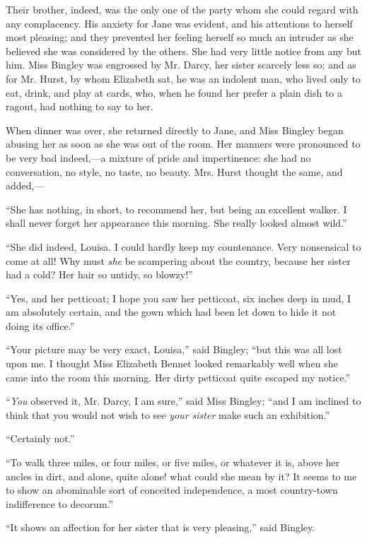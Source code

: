 Their brother, indeed, was the only one of the party whom she could regard with any complacency. His anxiety for Jane was evident, and his attentions to herself most pleasing; and they prevented her feeling herself so much an intruder as she believed she was considered by the others. She had very little notice from any but him. Miss Bingley was engrossed by Mr. Darcy, her sister scarcely less so; and as for Mr. Hurst, by whom Elizabeth sat, he was an indolent man, who lived only to eat, drink, and play at cards, who, when he found her prefer a plain dish to a ragout, had nothing to say to her.

When dinner was over, she returned directly to Jane, and Miss Bingley began abusing her as soon as she was out of the room. Her manners were pronounced to be very bad indeed,---a mixture of pride and impertinence: she had no conversation, no style, no taste, no beauty. Mrs. Hurst thought the same, and added,---

``She has nothing, in short, to recommend her, but being an excellent walker. I shall never forget her appearance this morning. She really looked almost wild.''

``She did indeed, Louisa. I could hardly keep my countenance. Very nonsensical to come at all! Why must \textit{she} be scampering about the country, because her sister had a cold? Her hair so untidy, so blowzy!''

``Yes, and her petticoat; I hope you saw her petticoat, six inches deep in mud, I am absolutely certain, and the gown which had been let down to hide it not doing its office.''

``Your picture may be very exact, Louisa,'' said Bingley; ``but this was all lost upon me. I thought Miss Elizabeth Bennet looked remarkably well when she came into the room this morning. Her dirty petticoat quite escaped my notice.''

``\textit{You} observed it, Mr. Darcy, I am sure,'' said Miss Bingley; ``and I am inclined to think that you would not wish to see \textit{your sister} make such an exhibition.''

``Certainly not.''

``To walk three miles, or four miles, or five miles, or whatever it is, above her ancles in dirt, and alone, quite alone! what could she mean by it? It seems to me to show an abominable sort of conceited independence, a most country-town indifference to decorum.''

``It shows an affection for her sister that is very pleasing,'' said Bingley.

